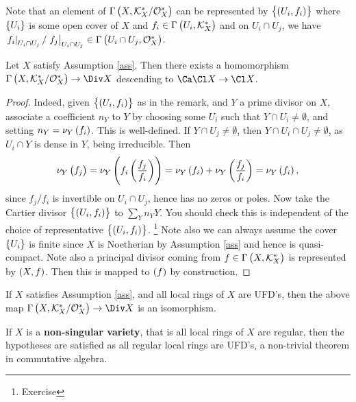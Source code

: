 \begin{remark*}
Note that an element of $ \Gamma\br{X, \KKK_X^* / \OOO_X^*} $ can be represented by $ \cbr{\br{U_i, f_i}} $ where $ \cbr{U_i} $ is some open cover of $ X $ and $ f_i \in \Gamma\br{U_i, \KKK_X^*} $ and on $ U_i \cap U_j $, we have $ \eval{f_i}_{U_i \cap U_j} / \eval{f_j}_{U_i \cap U_j} \in \Gamma\br{U_i \cap U_j, \OOO_X^*} $.
\end{remark*}

\begin{proposition}
Let $ X $ satisfy Assumption \ref{ass}. Then there exists a homomorphism $ \Gamma\br{X, \KKK_X^* / \OOO_X^*} \to \Div X $ descending to $ \Ca\Cl X \to \Cl X $.
\end{proposition}

\begin{proof}
Indeed, given $ \cbr{\br{U_i, f_i}} $ as in the remark, and $ Y $ a prime divisor on $ X $, associate a coefficient $ n_Y $ to $ Y $ by choosing some $ U_i $ such that $ Y \cap U_i \ne \emptyset $, and setting $ n_Y = \nu_Y\br{f_i} $. This is well-defined. If $ Y \cap U_j \ne \emptyset $, then $ Y \cap U_i \cap U_j \ne \emptyset $, as $ U_i \cap Y $ is dense in $ Y $, being irreducible. Then
$$ \nu_Y\br{f_j} = \nu_Y\br{f_i\br{\dfrac{f_j}{f_i}}} = \nu_Y\br{f_i} + \nu_Y\br{\dfrac{f_j}{f_i}} = \nu_Y\br{f_i}, $$
since $ f_j / f_i $ is invertible on $ U_i \cap U_j $, hence has no zeros or poles. Now take the Cartier divisor $ \cbr{\br{U_i, f_i}} $ to $ \sum_Y n_YY $. You should check this is independent of the choice of representative $ \cbr{\br{U_i, f_i}} $. \footnote{Exercise} Note also we can always assume the cover $ \cbr{U_i} $ is finite since $ X $ is Noetherian by Assumption \ref{ass} and hence is quasi-compact. Note also a principal divisor coming from $ f \in \Gamma\br{X, \KKK_X^*} $ is represented by $ \br{X, f} $. Then this is mapped to $ \br{f} $ by construction.
\end{proof}

\begin{proposition}
If $ X $ satisfies Assumption \ref{ass}, and all local rings of $ X $ are UFD's, then the above map $ \Gamma\br{X, \KKK_X^* / \OOO_X^*} \to \Div X $ is an isomorphism.
\end{proposition}

\begin{remark*}
If $ X $ is a \textbf{non-singular variety}, that is all local rings of $ X $ are regular, then the hypotheses are satisfied as all regular local rings are UFD's, a non-trivial theorem in commutative algebra.
\end{remark*}

